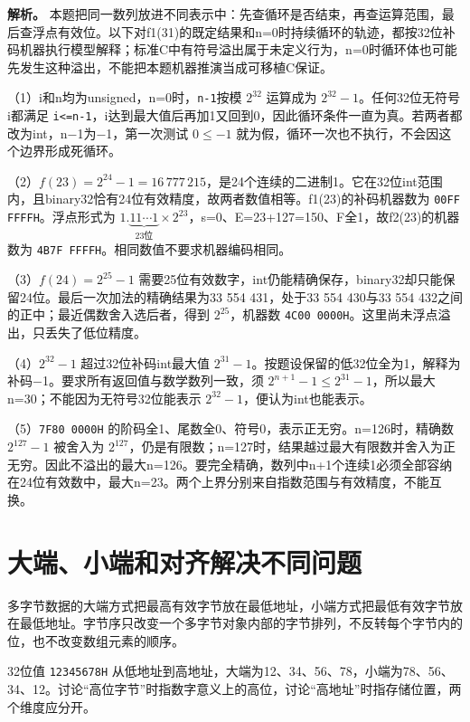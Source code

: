\textbf{解析。} 本题把同一数列放进不同表示中：先查循环是否结束，再查运算范围，最后查浮点有效位。以下对f1(31)的既定结果和n=0时持续循环的轨迹，都按32位补码机器执行模型解释；标准C中有符号溢出属于未定义行为，n=0时循环体也可能先发生这种溢出，不能把本题机器推演当成可移植C保证。

（1）i和n均为unsigned，n=0时，\texttt{n-1}按模 \(2^{32}\) 运算成为 \(2^{32}-1\)。任何32位无符号i都满足 \texttt{i<\allowbreak{}=\allowbreak{}n-1}，i达到最大值后再加1又回到0，因此循环条件一直为真。若两者都改为int，n\ensuremath{-}1为\ensuremath{-}1，第一次测试 \(0\le-1\) 就为假，循环一次也不执行，不会因这个边界形成死循环。

（2）\(f(23)=2^{24}-1=16\,777\,215\)，是24个连续的二进制1。它在32位int范围内，且binary32恰有24位有效精度，故两者数值相等。f1(23)的补码机器数为 \texttt{00FF FFFFH}。浮点形式为 \(1.\underbrace{11\cdots1}_{23\text{位}}\times2^{23}\)，s=0、E=23+127=150、F全1，故f2(23)的机器数为 \texttt{4B7F FFFFH}。相同数值不要求机器编码相同。

（3）\(f(24)=2^{25}-1\) 需要25位有效数字，int仍能精确保存，binary32却只能保留24位。最后一次加法的精确结果为33 554 431，处于33 554 430与33 554 432之间的正中；最近偶数舍入选后者，得到 \(2^{25}\)，机器数 \texttt{4C00 0000H}。这里尚未浮点溢出，只丢失了低位精度。

（4）\(2^{32}-1\) 超过32位补码int最大值 \(2^{31}-1\)。按题设保留的低32位全为1，解释为补码\ensuremath{-}1。要求所有返回值与数学数列一致，须 \(2^{n+1}-1\le2^{31}-1\)，所以最大n=30；不能因为无符号32位能表示 \(2^{32}-1\)，便认为int也能表示。

（5）\texttt{7F80 0000H} 的阶码全1、尾数全0、符号0，表示正无穷。n=126时，精确数 \(2^{127}-1\) 被舍入为 \(2^{127}\)，仍是有限数；n=127时，结果越过最大有限数并舍入为正无穷。因此不溢出的最大n=126。要完全精确，数列中n+1个连续1必须全部容纳在24位有效数中，最大n=23。两个上界分别来自指数范围与有效精度，不能互换。

\section{大端、小端和对齐解决不同问题}\label{CO02-25}

多字节数据的大端方式把最高有效字节放在最低地址，小端方式把最低有效字节放在最低地址。字节序只改变一个多字节对象内部的字节排列，不反转每个字节内的位，也不改变数组元素的顺序。

32位值 \texttt{12345678H} 从低地址到高地址，大端为12、34、56、78，小端为78、56、34、12。讨论``高位字节''时指数字意义上的高位，讨论``高地址''时指存储位置，两个维度应分开。

